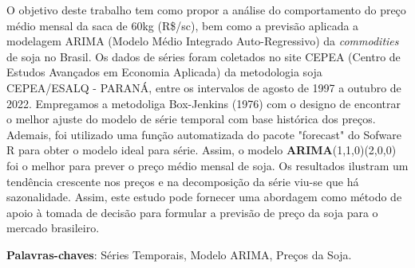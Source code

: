 \documentclass[
	12pt,				%
	openright,			%
	oneside,      %
	a4paper,			%
	english,			%
	french,				%
	spanish,			%
	brazil,				%
	]{abntex2}\usepackage[]{graphicx}\usepackage[table]{xcolor}
\theoremstyle{definition}
\theoremstyle{remark}
\begin{document}
\begin{resumo} 
O objetivo deste trabalho tem como propor a análise do comportamento do preço médio mensal da saca de 60kg (R\$/sc), bem como a previsão aplicada a modelagem ARIMA (Modelo Médio Integrado Auto-Regressivo) da \textit{commodities} de soja no Brasil. Os dados de séries foram coletados no site CEPEA (Centro de Estudos Avançados em Economia Aplicada) da metodologia soja CEPEA/ESALQ - PARANÁ, entre os intervalos de agosto de 1997 a outubro de 2022. Empregamos a metodoliga Box-Jenkins (1976) com o designo de encontrar o melhor ajuste do modelo de série temporal com base histórica dos preços. Ademais, foi utilizado uma função automatizada do pacote "forecast" do Sofware R para obter o modelo ideal para série. Assim, o modelo \textbf{ARIMA}(1,1,0)(2,0,0) foi o melhor para prever o preço médio mensal de soja. Os resultados ilustram um tendência crescente nos preços e na decomposição da série viu-se que há sazonalidade. Assim, este estudo pode fornecer uma abordagem como método de apoio à tomada de decisão para formular a previsão de preço da soja para o mercado brasileiro.
  \vspace{\onelineskip} 
  \noindent
  
  \textbf{Palavras-chaves}: Séries Temporais, Modelo ARIMA, Preços da Soja.
\end{resumo}

\listoffigures*
\cleardoublepage

\listoftables*
\cleardoublepage


  
\end{document}
